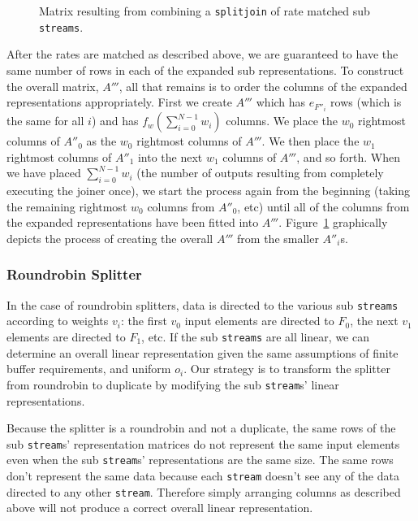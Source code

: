 \begin{figure}
\center
\epsfxsize=3.0in
\caption{Matrix resulting from combining a {\tt splitjoin} of rate matched sub {\tt streams}.}
\label{fig:splitjoin-duplicate-matrix}
\end{figure}

After the rates are matched as described above, we are guaranteed to have the same number of rows
in each of the expanded sub representations. To construct the overall matrix, $A'''$, 
all that remains is to order the columns of the expanded representations appropriately. 
First we create $A'''$ which has $e_{F''_i}$ rows (which is the same for all $i$) and has 
$f_w(\sum_{i=0}^{N-1}w_i)$ columns. 
We place the $w_0$ rightmost columns of $A''_0$ as the $w_0$ rightmost 
columns of $A'''$. We then place the $w_1$ rightmost columns of $A''_1$ into the next $w_1$ columns 
of $A'''$, and so forth. When we have placed $\sum_{i=0}^{N-1}w_{i}$ (the number of outputs resulting from 
completely executing the joiner once), we start the process again from the beginning (taking the remaining
rightmost $w_0$ columns from $A''_0$, etc) until all of the columns from the expanded representations have
been fitted into $A'''$. Figure~\ref{fig:splitjoin-duplicate-matrix} graphically depicts the process of 
creating the overall $A'''$ from the smaller $A''_i$s.



\subsubsection{Roundrobin Splitter}

In the case of roundrobin splitters, data is directed to the various sub {\tt streams} 
according to weights $v_i$: the first $v_0$ input elements are directed to $F_0$, the next
$v_1$ elements are directed to $F_1$, etc. If the sub {\tt streams} are
all linear, we can determine an overall linear representation given the same
assumptions of finite buffer requirements, and uniform $o_i$.
Our strategy is to transform the splitter from roundrobin to duplicate by
modifying the sub {\tt stream}s' linear representations. 

Because the splitter is a roundrobin and not a duplicate, the same rows of the sub 
{\tt stream}s' representation matrices do not represent the same input elements 
even when the sub {\tt stream}s' representations are the same size. 
The same rows don't represent the same data because each {\tt stream} 
doesn't see any of the data directed to any other {\tt stream}. Therefore simply 
arranging columns as described above will not produce a correct overall linear representation. 

